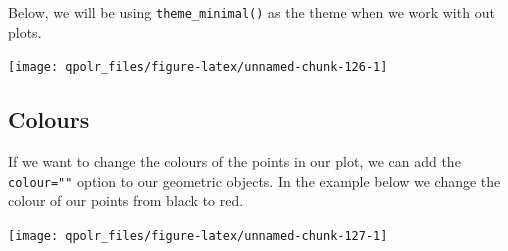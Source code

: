 \documentclass[12pt,oneside]{reedthesis}
\theoremstyle{definition}
\theoremstyle{definition}
\theoremstyle{definition}
\theoremstyle{remark}
\begin{document}
  Below, we will be using \texttt{theme\_minimal()} as the theme when we
  work with out plots.
  \begin{Shaded}
  \begin{Highlighting}[]
  \NormalTok{(}\OperatorTok{+}
  \StringTok{  }\NormalTok{(} \NormalTok{) }\OperatorTok{+}\StringTok{ }
  \StringTok{  }\NormalTok{(}\NormalTok{, }\NormalTok{) }\OperatorTok{+}
  \StringTok{  }\NormalTok{()}
  \end{Highlighting}
  \end{Shaded}
  \begin{center}\texttt{[image: qpolr\_files/figure-latex/unnamed-chunk-126-1]} \end{center}
  
  \subsection{Colours}\label{colours}
  
  If we want to change the colours of the points in our plot, we can add
  the \texttt{colour=""} option to our geometric objects. In the example
  below we change the colour of our points from black to red.
  \begin{Shaded}
  \begin{Highlighting}[]
  \NormalTok{(}\OperatorTok{+}
  \StringTok{  }\NormalTok{(} \NormalTok{, }\NormalTok{) }\OperatorTok{+}\StringTok{ }
  \StringTok{  }\NormalTok{(}\NormalTok{, }\NormalTok{) }\OperatorTok{+}
  \StringTok{  }\NormalTok{()}
  \end{Highlighting}
  \end{Shaded}
  \begin{center}\texttt{[image: qpolr\_files/figure-latex/unnamed-chunk-127-1]} \end{center}
  
\end{document}

